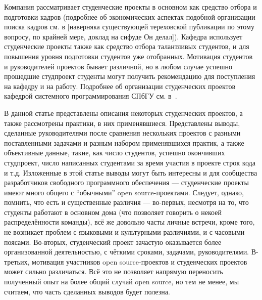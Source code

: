 \documentclass[a5paper]{article}
\begin{document}
Компания рассматривает студенческие проекты в основном как средство отбора и подготовки кадров (подробнее об экономических аспектах подобной организации поиска кадров см. в [наверняка существующей тереховской публикации по этому вопросу, по крайней мере, доклад на сифуде Он делал]). Кафедра использует студенческие проекты также как средство отбора талантливых студентов, и для повышения уровня подготовки студентов уже отобранных. Мотивация студентов и руководителей проектов бывает различной, но в любом случае успешно прошедшие студпроект студенты могут получить рекомендацию для поступления на кафедру и на работу. Подробнее об организации студенческих проектов кафедрой системного программирования СПбГУ см. в~\cite{gagarsky}.

В данной статье представлены описания некоторых студенческих проектов, а также рассмотрены практики, в них применявшиеся. Представлены выводы, сделанные руководителями после сравнения нескольких проектов с разными поставленными задачами и разным набором применявшихся практик, а также объективные данные, такие, как число студентов, успешно окончивших студпроект, число написанных студентами за время участия в проекте строк кода и т.д. Изложенные в этой статье выводы могут быть интересны и для сообщества разработчиков свободного программного обеспечения --- студенческие проекты имеют много общего с ``обычными'' open source-проектами. Следует, однако, помнить, что есть и существенные различия --- во-первых, несмотря на то, что студенты работают в основном дома (что позволяет говорить о некоей распределённости команды), всё же довольно часты личные встречи, кроме того, не возникает проблем с языковыми и культурными различиями, и с часовыми поясами. Во-вторых, студенческий проект зачастую оказывается более организованной деятельностью, с чёткими сроками, задачами, руководителями. В-третьих, мотивация участников open source-проектов и студенческих проектов может сильно различаться. Всё это не позволяет напрямую переносить полученный опыт на более общий случай open source, но тем не менее, мы считаем, что часть сделанных выводов будет полезна.
\end{document}
